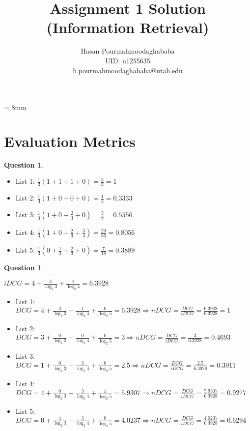 \documentclass[11pt,a4paper,reqno]{amsart}
\theoremstyle{definition}
\theoremstyle{notation}
\newtheorem{question}[theorem]{Question}
\begin{document}
\title[Assignment 1 Solution (Information Retrieval)]
{Assignment 1 Solution (Information Retrieval)}


\author[Hasan Pourmahmoodaghababa]{Hasan Pourmahmoodaghababa \\ UID: u1255635 \\ h.pourmahmoodaghababa@utah.edu}
    \address{School of Computing, University of Utah, Utah, USA}


\maketitle

\baselineskip = 8mm


\section{Evaluation Metrics}

\begin{question}%
\end{question}
\begin{itemize}
\item List 1: $\frac{1}{3}(1+1+1+0)=\frac{3}{3} = 1$
\item List 2: $\frac{1}{3}(1+0+0+0)=\frac{1}{3} = 0.3333$
\item List 3: $\frac{1}{3}(1+0+\frac{2}{3}+0)=\frac{5}{9}=0.5556$
\item List 4: $\frac{1}{3}(1+0+\frac{2}{3}+\frac{3}{4})=\frac{29}{36} = 0.8056$
\item List 5: $\frac{1}{3}(0+\frac{1}{2}+\frac{2}{3}+0)=\frac{7}{18} = 0.3889$
\end{itemize}


\begin{question}%
\end{question}

$iDCG = 4+\frac{3}{\log_2 3}+\frac{1}{\log_2 4} = 6.3928$
\begin{itemize}
\item List 1: $DCG = 4+\frac{3}{\log_2 3}+\frac{1}{\log_2 4}+\frac{0}{\log_2 5} = 6.3928 \Longrightarrow nDCG = \frac{DCG}{iDCG} = \frac{6.3928}{6.3928}=1$
\item List 2: $DCG = 3+\frac{0}{\log_2 3}+\frac{0}{\log_2 4}+\frac{0}{\log_2 5} = 3 \Longrightarrow nDCG = \frac{DCG}{iDCG} = \frac{3}{6.3928}= 0.4693$
\item List 3: $DCG = 1+\frac{0}{\log_2 3}+\frac{3}{\log_2 4}+\frac{0}{\log_2 5} = 2.5 \Longrightarrow nDCG = \frac{DCG}{iDCG} = \frac{2.5}{6.3928}= 0.3911$
\item List 4: $DCG = 4+\frac{0}{\log_2 3}+\frac{3}{\log_2 4}+\frac{1}{\log_2 5} = 5.9307 \Longrightarrow nDCG = \frac{DCG}{iDCG} = \frac{5.9307}{6.3928}= 0.9277$
\item List 5: $DCG = 0+\frac{4}{\log_2 3}+\frac{3}{\log_2 4}+\frac{0}{\log_2 5} = 4.0237 \Longrightarrow nDCG = \frac{DCG}{iDCG} = \frac{4.0237}{6.3928}= 0.6294$
\end{itemize}
\end{document}

